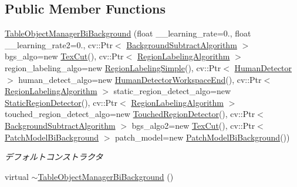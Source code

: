 \subsection*{Public Member Functions}
\begin{DoxyCompactItemize}
\item 
\hypertarget{classskl_1_1_table_object_manager_bi_background_a99f6f3daa03e567d324f27242a2a5440}{}\label{classskl_1_1_table_object_manager_bi_background_a99f6f3daa03e567d324f27242a2a5440} 
\hyperlink{classskl_1_1_table_object_manager_bi_background_a99f6f3daa03e567d324f27242a2a5440}{Table\+Object\+Manager\+Bi\+Background} (float \+\_\+\+\_\+learning\+\_\+rate=0., float \+\_\+\+\_\+learning\+\_\+rate2=0., cv\+::\+Ptr$<$ \hyperlink{classskl_1_1_background_subtract_algorithm}{Background\+Subtract\+Algorithm} $>$ bgs\+\_\+algo=new \hyperlink{classskl_1_1_tex_cut}{Tex\+Cut}(), cv\+::\+Ptr$<$ \hyperlink{classskl_1_1_filter_mat2_mat}{Region\+Labeling\+Algorithm} $>$ region\+\_\+labeling\+\_\+algo=new \hyperlink{classskl_1_1_region_labeling_simple}{Region\+Labeling\+Simple}(), cv\+::\+Ptr$<$ \hyperlink{classskl_1_1_filter_mat2_mat}{Human\+Detector} $>$ human\+\_\+detect\+\_\+algo=new \hyperlink{classskl_1_1_human_detector_workspace_end}{Human\+Detector\+Workspace\+End}(), cv\+::\+Ptr$<$ \hyperlink{classskl_1_1_filter_mat2_mat}{Region\+Labeling\+Algorithm} $>$ static\+\_\+region\+\_\+detect\+\_\+algo=new \hyperlink{classskl_1_1_static_region_detector}{Static\+Region\+Detector}(), cv\+::\+Ptr$<$ \hyperlink{classskl_1_1_filter_mat2_mat}{Region\+Labeling\+Algorithm} $>$ touched\+\_\+region\+\_\+detect\+\_\+algo=new \hyperlink{classskl_1_1_touched_region_detector}{Touched\+Region\+Detector}(), cv\+::\+Ptr$<$ \hyperlink{classskl_1_1_background_subtract_algorithm}{Background\+Subtract\+Algorithm} $>$ bgs\+\_\+algo2=new \hyperlink{classskl_1_1_tex_cut}{Tex\+Cut}(), cv\+::\+Ptr$<$ \hyperlink{classskl_1_1_patch_model_bi_background}{Patch\+Model\+Bi\+Background} $>$ patch\+\_\+model=new \hyperlink{classskl_1_1_patch_model_bi_background}{Patch\+Model\+Bi\+Background}())
\begin{DoxyCompactList}\small\item\em デフォルトコンストラクタ \end{DoxyCompactList}\item 
\hypertarget{classskl_1_1_table_object_manager_bi_background_aec0a2e4c54a2acdc20577fc849538f6b}{}\label{classskl_1_1_table_object_manager_bi_background_aec0a2e4c54a2acdc20577fc849538f6b} 
virtual \hyperlink{classskl_1_1_table_object_manager_bi_background_aec0a2e4c54a2acdc20577fc849538f6b}{$\sim$\+Table\+Object\+Manager\+Bi\+Background} ()

\end{DoxyCompactItemize}
